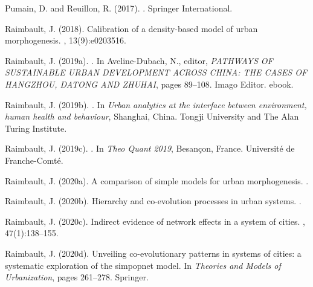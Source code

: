\documentclass[11pt]{article}
\begin{document}
\begin{thebibliography}{}
Pumain, D. and Reuillon, R. (2017).
.
\newblock Springer International.

Raimbault, J. (2018).
\newblock Calibration of a density-based model of urban morphogenesis.
, 13(9):e0203516.

Raimbault, J. (2019a).
.
\newblock In Aveline-Dubach, N., editor, {\em {PATHWAYS OF SUSTAINABLE URBAN
  DEVELOPMENT ACROSS CHINA: THE CASES OF HANGZHOU, DATONG AND ZHUHAI}}, pages
  89--108. {Imago Editor}.
\newblock ebook.

Raimbault, J. (2019b).
.
\newblock In {\em {Urban analytics at the interface between environment, human
  health and behaviour}}, Shanghai, China. {Tongji University and The Alan
  Turing Institute}.

Raimbault, J. (2019c).
.
\newblock In {\em {Theo Quant 2019}}, Besan{\c c}on, France. {Universit{\'e} de
  Franche-Comt{\'e}}.

Raimbault, J. (2020a).
\newblock A comparison of simple models for urban morphogenesis.
.

Raimbault, J. (2020b).
\newblock Hierarchy and co-evolution processes in urban systems.
.

Raimbault, J. (2020c).
\newblock Indirect evidence of network effects in a system of cities.
,
  47(1):138--155.

Raimbault, J. (2020d).
\newblock Unveiling co-evolutionary patterns in systems of cities: a systematic
  exploration of the simpopnet model.
\newblock In {\em Theories and Models of Urbanization}, pages 261--278.
  Springer.


\end{thebibliography}
\end{document}
